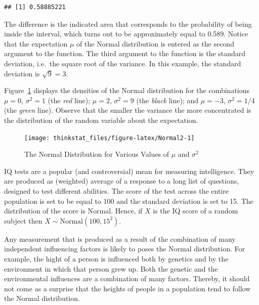 \documentclass[]{krantz}
\theoremstyle{definition}
\theoremstyle{definition}
\theoremstyle{definition}
\theoremstyle{remark}
\let\BeginKnitrBlock\begin \let\EndKnitrBlock\end
\begin{document}
\begin{verbatim}
## [1] 0.58885221
\end{verbatim}

The difference is the indicated area that corresponds to the probability
of being inside the interval, which turns out to be approximately equal
to 0.589. Notice that the expectation \(\mu\) of the Normal distribution
is entered as the second argument to the function. The third argument to
the function is the standard deviation, i.e.~the square root of the
variance. In this example, the standard deviation is \(\sqrt{9}=3\).

Figure~\ref{fig:Normal2} displays the densities of the Normal
distribution for the combinations \(\mu= 0\), \(\sigma^2 = 1\) (the
\emph{red} line); \(\mu = 2\), \(\sigma^2 = 9\) (the \emph{black} line);
and \(\mu = -3\), \(\sigma^2 = 1/4\) (the \emph{green} line). Observe
that the smaller the variance the more concentrated is the distribution
of the random variable about the expectation.

\begin{figure}

{\centering \texttt{[image: thinkstat\_files/figure-latex/Normal2-1]} 

}

\caption{The Normal Distribution for Various Values of $\mu$ and $\sigma^2$}\label{fig:Normal2}
\end{figure}

\BeginKnitrBlock{example}
\protect\hypertarget{exm:exnormal1}{}{\label{exm:exnormal1} }IQ tests are a
popular (and controversial) mean for measuring intelligence. They are
produced as (weighted) average of a response to a long list of
questions, designed to test different abilities. The score of the test
across the entire population is set to be equal to 100 and the standard
deviation is set to 15. The distribution of the score is Normal. Hence,
if \(X\) is the IQ score of a random subject then
\(X \sim \mathrm{Normal}(100,15^2)\).
\EndKnitrBlock{example}

\BeginKnitrBlock{example}
\protect\hypertarget{exm:exnormal2}{}{\label{exm:exnormal2} }Any measurement
that is produced as a result of the combination of many independent
influencing factors is likely to poses the Normal distribution. For
example, the hight of a person is influenced both by genetics and by the
environment in which that person grew up. Both the genetic and the
environmental influences are a combination of many factors. Thereby, it
should not come as a surprise that the heights of people in a population
tend to follow the Normal distribution.
\EndKnitrBlock{example}
\end{document}
